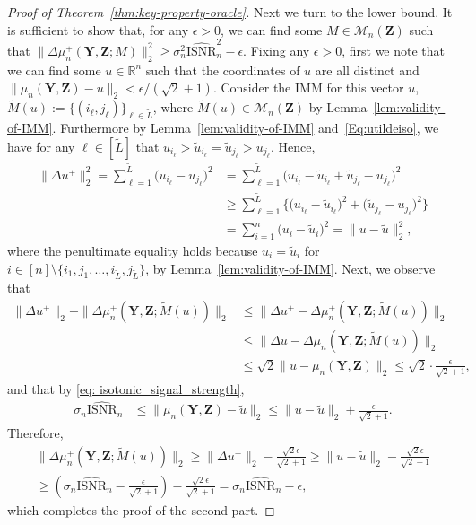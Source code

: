 \documentclass[12pt]{article}
\newcommand{\ISNR}{\mathrm{ISNR}}
\newcommand{\bY}{\mathbf{Y}}
\newcommand{\bZ}{\mathbf{Z}}
\newcommand{\RR}{\mathbb{R}}
\begin{document}
\begin{proof}[Proof of Theorem~\ref{thm:key-property-oracle}]
    Next we turn to the lower bound. It is sufficient to show that, for any $\epsilon>0$, we can find some $M\in\mathcal{M}_n(\bZ)$ such that
    $\|\Delta\mu_n^+(\bY,\bZ;M)\|_2^2 \geq \sigma_n^2\widehat{\ISNR}_n^2 - \epsilon$.
    Fixing any $\epsilon>0$, first we note that we can find some $u\in \RR^n$ such that the coordinates of $u$ are all distinct and $\|\mu_n(\bY,\bZ)-u\|_2<\epsilon/(\sqrt{2}+1)$. Consider the IMM for this vector $u$,  $\widetilde{M}(u) := \{(i_\ell,j_\ell)\}_{\ell \in \tilde{L}}$, where $\widetilde{M}(u)\in \mathcal{M}_n(\bZ)$ by Lemma~\ref{lem:validity-of-IMM}.
Furthermore  by Lemma~\ref{lem:validity-of-IMM} and~\eqref{Eq:utildeiso}, we have for any $\ell\in [\tilde{L}]$ that
$u_{i_\ell} > \tilde{u}_{i_\ell} = \tilde{u}_{j_\ell} >u_{j_\ell}$. 
    Hence, 
    \begin{align*}
      \|\Delta u^+\|_2^2=\sum_{\ell=1}^{\tilde{L}}\bigl(u_{i_\ell}-u_{j_\ell}\bigr)^2
      & = \sum_{\ell=1}^{ \tilde{L}}\bigl(u_{i_\ell}-\tilde{u}_{i_\ell}+\tilde{u}_{j_\ell}-u_{j_\ell}\bigr)^2  \\
      &\geq \sum_{\ell=1}^{\tilde{L}}\bigl\{\bigl(u_{i_\ell}-\tilde{u}_{i_\ell}\bigr)^2 + \bigl(\tilde{u}_{j_\ell}-u_{j_\ell}\bigr)^2\bigr\} \\
      &=\sum_{i=1}^n \bigl(u_i-\tilde{u}_i\bigr)^2=\|u-\tilde{u}\|_2^2,
    \end{align*}
    where the penultimate equality holds because $u_i=\tilde{u}_i$ for $i \in [n] \setminus \{i_1,j_1,\ldots,i_{\tilde{L}},j_{\tilde{L}}\}$, by Lemma~\ref{lem:validity-of-IMM}.
    Next, we observe that 
    \begin{align*}
        \|\Delta u^+\|_2-\|\Delta\mu_n^+(\bY,\bZ;\widetilde{M}(u))\|_2&\leq \|\Delta u^+-\Delta\mu_n^+(\bY,\bZ;\widetilde{M}(u))\|_2\\
        &\leq \|\Delta u-\Delta\mu_n(\bY,\bZ;\widetilde{M}(u))\|_2\\
        &\leq \sqrt{2} \|u-\mu_n(\bY,\bZ)\|_2\leq\sqrt{2} \cdot \frac{\epsilon}{\sqrt{2}+1},
    \end{align*}
    and that by \eqref{eq: isotonic_signal_strength},
    \begin{align*}
        \sigma_n\widehat{\ISNR}_n &\leq \|\mu_n(\bY,\bZ)-\tilde u\|_2\leq \|u-\tilde{u}\|_2+\frac{\epsilon}{\sqrt{2}+1}.
    \end{align*}
    Therefore,
    \begin{multline*}
    \|\Delta\mu_n^+(\bY,\bZ;\widetilde{M}(u))\|_2 \geq \|\Delta u^+\|_2 - \frac{\sqrt{2}\epsilon}{\sqrt{2}+1}\geq \|u-\tilde{u}\|_2 - \frac{\sqrt{2}\epsilon}{\sqrt{2}+1}\\\geq \left(\sigma_n\widehat{\ISNR}_n -\frac{\epsilon}{\sqrt{2}+1}\right) - \frac{\sqrt{2}\epsilon}{\sqrt{2}+1} = \sigma_n\widehat{\ISNR}_n -\epsilon,
    \end{multline*}
    which completes the proof of the second part.
\end{proof}
\end{document}
